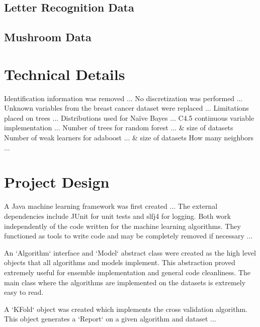 \documentclass[11pt]{article}
\begin{document}
\subsection{Letter Recognition Data}
\subsection{Mushroom Data}

\section{Technical Details}
Identification information was removed ...
No discretization was performed ...
Unknown variables from the breast cancer dataset were replaced ...
Limitations placed on trees ...
Distributions used for Naïve Bayes ...
C4.5 continuous variable implementation ...
Number of trees for random forest ... & size of datasets
Number of weak learners for adaboost ... & size of datasets
How many neighbors ...

\section{Project Design}
A Java machine learning framework was first created ...
The external dependencies include JUnit for unit tests and slfj4 for logging. Both work independently of the code written for the machine learning algorithms. They functioned as tools to write code and may be completely removed if necessary ...

An `Algorithm` interface and `Model` abstract class were created as the high level objects that all algorithms and models implement. This abstraction proved extremely useful for ensemble implementation and general code cleanliness. The main class where the algorithms are implemented on the datasets is extremely easy to read.

A `KFold` object was created which implements the cross validation algorithm. This object generates a `Report` on a given algorithm and dataset ...
\end{document}
